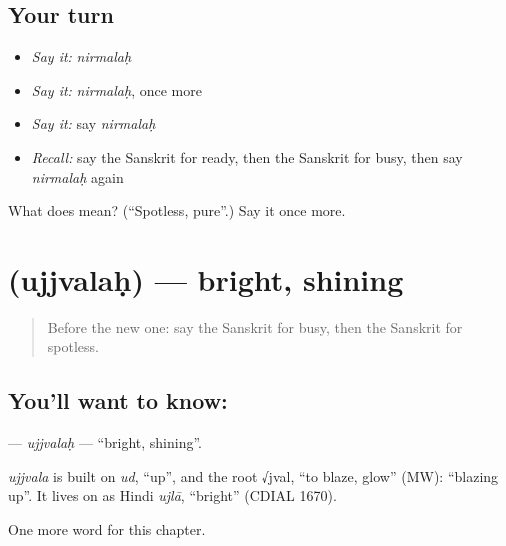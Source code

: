 \subsection*{Your turn}
\begin{itemize}
\raggedright
  \item \emph{Say it:} \emph{nirmalaḥ}
  \item \emph{Say it:} \emph{nirmalaḥ}, once more
  \item \emph{Say it:} say \emph{nirmalaḥ}
  \item \emph{Recall:} say the Sanskrit for ready, then the Sanskrit for busy, then say \emph{nirmalaḥ} again
\end{itemize}

\begin{tcolorbox}[breakable,colback=teal!4,colframe=teal!35!black,title={Before you move on}]
What does  mean? (\textquotedblleft{}Spotless, pure\textquotedblright{}.) Say it once more.
\end{tcolorbox}
\section[\texorpdfstring{\sk{उज्ज्वलः} (ujjvalaḥ)}{उज्ज्वलः (ujjvalaḥ)}]{ (ujjvalaḥ) — bright, shining}

\label{lesson:SA-C188-ujjvalah}



\begin{quote}
Before the new one: say the Sanskrit for busy, then the Sanskrit for spotless.
\end{quote}

\subsection*{You'll want to know: }
\textbf{} — \emph{ujjvalaḥ} — \textquotedblleft{}bright, shining\textquotedblright{}.

\begin{cousinweb}
\emph{ujjvala} is built on \emph{ud}, \textquotedblleft{}up\textquotedblright{}, and the root √jval, \textquotedblleft{}to blaze, glow\textquotedblright{} (MW): \textquotedblleft{}blazing up\textquotedblright{}. It lives on as Hindi \emph{ujlā}, \textquotedblleft{}bright\textquotedblright{} (CDIAL 1670).
\end{cousinweb}

\begin{grammarlens}[title={What you've built}]
One more word for this chapter.
\end{grammarlens}

